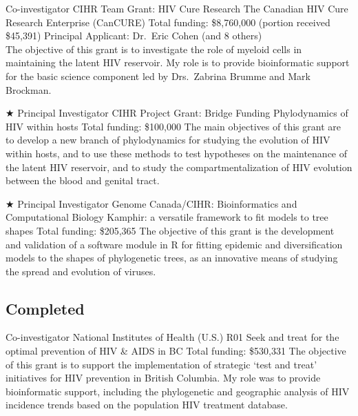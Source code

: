 \documentclass[11pt]{moderncv}
\begin{document}
{Co-investigator}
{CIHR Team Grant: HIV Cure Research}
{The Canadian HIV Cure Research Enterprise (CanCURE)}
{Total funding: \$8,760,000 (portion received \$45,391)}
{
Principal Applicant: Dr.~Eric Cohen (and 8 others)\\
The objective of this grant is to investigate the role of myeloid cells in maintaining the latent HIV reservoir.
My role is to provide bioinformatic support for the basic science component led by Drs.~Zabrina Brumme and Mark Brockman.\\
}

{$\bigstar$ Principal Investigator}
{CIHR Project Grant: Bridge Funding}  %
{Phylodynamics of HIV within hosts}
{Total funding: \$100,000}
{
The main objectives of this grant are to develop a new branch of phylodynamics for studying the evolution of HIV within hosts, and to use these methods to test hypotheses on the maintenance of the latent HIV reservoir, and to study the compartmentalization of HIV evolution between the blood and genital tract.\\
}


{$\bigstar$ Principal Investigator}  %
{Genome Canada/CIHR: Bioinformatics and Computational Biology}
{Kamphir: a versatile framework to fit models to tree shapes}
{Total funding: \$205,365}
{
The objective of this grant is the development and validation of a software module in R for fitting epidemic and diversification models to the shapes of phylogenetic trees, as an innovative means of studying the spread and evolution of viruses.\\
}





\vspace{1em}

\subsection {Completed}

{Co-investigator}
{National Institutes of Health (U.S.) R01}
{Seek and treat for the optimal prevention of HIV \& AIDS in BC}
{Total funding: \$530,331}
{
The objective of this grant is to support the implementation of strategic `test and treat' initiatives for HIV prevention in British Columbia.
My role was to provide bioinformatic support, including the phylogenetic and geographic analysis of HIV incidence trends based on the population HIV treatment database.\\
}
\end{document}
